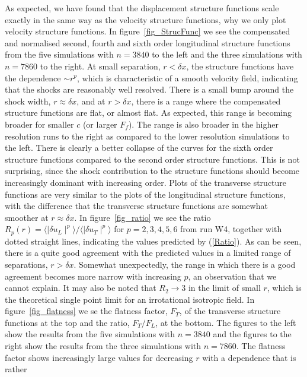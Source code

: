 \documentclass{jfm}
\begin{document}
As expected, we have found that the displacement structure functions scale
exactly in the same way as the velocity structure functions, why we only plot
velocity structure functions. In figure~\ref{fig_StrucFunc} we see the
compensated and normalised second, fourth and sixth order longitudinal
structure functions from the five simulations with $ n = 3840 $ to the left and
the three simulations with $ n = 7860 $ to the right. At small separation, $ r
< \delta x $, the structure functions have the dependence $ \sim r^{p} $, which
is characteristic of a smooth velocity field, indicating that the shocks are
reasonably well resolved. There is a small bump around the shock width, $ r
\approx \delta x $, and at $ r > \delta x $, there is a range where the
compensated structure functions are flat, or almost flat. As expected, this
range is becoming broader for smaller $ c $ (or larger $ F_f $). The range is
also broader in the higher resolution runs to the right as compared to the
lower resolution simulations to the left. There is clearly a better collapse of
the curves for the sixth order structure functions compared to the second order
structure functions. This is not surprising, since the shock contribution to
the structure functions should become increasingly dominant with increasing
order. Plots of the transverse structure functions are very similar to the
plots of the longitudinal structure functions, with the difference that the
transverse structure functions are somewhat smoother at $ r \approx \delta x $.
In figure~\ref{fig_ratio} we see the ratio $ R_{p}(r) = \langle \mid \delta
u_L \mid ^{p} \rangle / \langle \mid \delta u_T \mid ^{p} \rangle$ for $ p=
2,3,4,5,6 $ from run W4, together with dotted straight lines, indicating the
values predicted by (\ref{Ratio}). As can be seen, there is a quite good
agreement with the predicted values in a limited range of separations, $ r >
\delta x $. Somewhat unexpectedly, the range in which there is a good agreement
becomes more narrow with increasing $ p $, an observation that we cannot
explain. It may also be noted that $ R_2 \rightarrow 3 $ in the limit of small
$ r $, which is the theoretical single point limit for an irrotational
isotropic field. In figure~\ref{fig_flatness} we se the flatness factor, $
F_T $, of the transverse structure functions at the top and the ratio, $
F_T/F_L $, at the bottom. The figures to the left show the results from the
five simulations with $ n = 3840 $ and the figures to the right show the
results from the three simulations with $ n = 7860 $. The flatness factor shows
increasingly large values for decreasing $ r $ with a dependence that is rather
\end{document}

